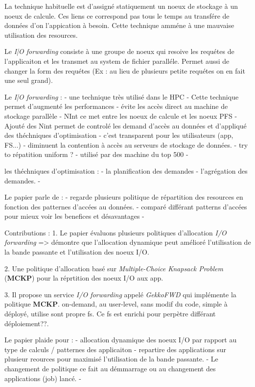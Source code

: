 \documentclass[10pt, a4paper]{article}
\begin{document}
La technique habituelle est d'assigné statiquement un noeux de stockage à un noeux de calcule.
Ces liens ce correspond pas tous le temps au transfére de données d'on l'appication à besoin.
Cette technique amméne à une mauvaise utilisation des resources.


Le \emph{I|O forwarding} consiste à une groupe de noeux qui resoive les requétes de
l'applicaiton et les transmet au system de fichier paralléle. Permet aussi de changer la form
des requétes (Ex : au lieu de plusieurs petite requétes on en fait une seul grand).

Le \emph{I|O forwarding} :
- une technique très utilisé dans le HPC
- Cette technique permet d'augmenté les performances
- évite les accès direct au machine de stockage parallèle
- NInt ce met entre les noeux de calcule et les noeux PFS
- Ajouté des Nint permet de controlé les demand d'accès au données et d'appliqué des théchniques d'optimisation
- c'est transparent pour les utilisateurs (app, FS...)
- diminuent la contention à accès au serveurs de stockage de données.
- try to répatition uniform ?
- utilisé par des machine du top 500
- 


les théchniques d'optimisation :
- la planification des demandes
- l'agrégation des demandes.
-


Le papier parle de :
- regarde plusieurs politique de répartition des resources en fonction des patternes d'accées au données.
- comparé différant patterns d'accées pour mieux voir les benefices et désavantages
- 

Contributions :
1. Le papier évaluons plusieurs politiques d'allocation \emph{I/O forwarding} => démontre que l'allocation dynamique peut amélioré l'utilisation de la bande passante et l'utilisation des noeux I/O.

2. Une politique d'allocation basé sur \emph{Multiple-Choice Knapsack Problem} (\textbf{MCKP}) pour la réprtition des noeux I/O aux app.

3. Il propose un service \emph{I/O forwarding} appelé \emph{GekkoFWD} qui implémente la politique \textbf{MCKP}. on-demand, au user-level, sans modif du code, simple à déployé, utilise sont propre fs.
Ce fs est enrichi pour perpètre différant déploiement??.

Le papier plaide pour :
- allocation dynamique des noeux I/O par rapport au type de calculs / patternes des applicaiton
- repartire des applications sur plusieur reources pour maximisé l'utilisation de la bande passante.
- Le changement de politique ce fait au démmarrage ou au changement des applications (job) lancé.
- 
\end{document}
